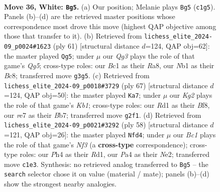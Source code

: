 \documentclass[11pt]{article}
\begin{document}
\clearpage

\begin{figure}[p]\centering
\begin{subfigure}{0.46\textwidth}\centering
\resizebox{\linewidth}{!}{%
\newchessgame
\chessboard[
  setfen={r1b2k2/3pr1bp/1q2p3/p4p1B/P1np3P/5NQ1/1P3PK1/RNBR4 w - - 2 36},
  showmover=false,
  pgfstyle=straightmove, color=movearrow, markmove={c1-g5}
]}
\caption{}
\end{subfigure}\hfill
\begin{subfigure}{0.46\textwidth}\centering
\resizebox{\linewidth}{!}{%
\newchessgame
\chessboard[
  setfen={r1b1r1k1/p4pp1/2P4p/3p3P/Q2Nn1q1/4P1P1/1PR2P2/4KB1R b K - 0 31},
  showmover=false,
  pgfstyle=straightmove, color=movearrow, markmove={g4-g5}
]}
\caption{}
\end{subfigure}
\\[4pt]
\begin{subfigure}{0.46\textwidth}\centering
\resizebox{\linewidth}{!}{%
\newchessgame
\chessboard[
  setfen={1k3b2/1b6/pnr1p1Q1/qn1pP1P1/1p1P4/1P6/P1P1N2P/1KB2B1R b - - 0 34},
  showmover=false,
  pgfstyle=straightmove, color=movearrow, markmove={b8-a7}
]}
\caption{}
\end{subfigure}\hfill
\begin{subfigure}{0.46\textwidth}\centering
\resizebox{\linewidth}{!}{%
\newchessgame
\chessboard[
  setfen={2r3k1/1b5p/1p3qp1/1Bbp1p2/Pp2n3/1P1Q1N2/4NPPP/3R2K1 w - - 8 30},
  showmover=false,
  pgfstyle=straightmove, color=movearrow, markmove={f3-d4}
]}
\caption{}
\end{subfigure}
\caption{\textbf{Move 36, White: \texttt{Bg5}.} (a) Our position; Melanie plays \texttt{Bg5} (\texttt{c1g5}). Panels (b)--(d) are the retrieved master positions whose correspondence most drove this move (highest QAP objective among those that transfer to it). (b) Retrieved from \texttt{lichess\_elite\_2024-09\_p0024\#1623} (ply 61) [structural distance $d$=124, QAP obj=62]: the master played \texttt{Qg5}; under $\mu$ our \emph{Qg3} plays the role of that game's \emph{Qg5}; cross-type roles: our \emph{B}c1 as their \emph{R}a8, our \emph{N}b1 as their \emph{B}c8; transferred move \texttt{g3g5}. (c) Retrieved from \texttt{lichess\_elite\_2024-09\_p0018\#3729} (ply 67) [structural distance $d$=124, QAP obj=50]: the master played \texttt{Ka7}; under $\mu$ our \emph{Kg2} plays the role of that game's \emph{Kb1}; cross-type roles: our \emph{R}d1 as their \emph{B}f8, our \emph{r}e7 as their \emph{B}b7; transferred move \texttt{g2f1}. (d) Retrieved from \texttt{lichess\_elite\_2024-09\_p0021\#3292} (ply 58) [structural distance $d$=121, QAP obj=26]: the master played \texttt{Nfd4}; under $\mu$ our \emph{Bc1} plays the role of that game's \emph{Nf3} (a \textbf{cross-type} correspondence); cross-type roles: our \emph{P}h4 as their \emph{R}d1, our \emph{P}a4 as their \emph{N}e2; transferred move \texttt{c1e3}. Synthesis: no retrieved analog transferred to \texttt{Bg5} -- the \texttt{search} selector chose it on value (material / mate); panels (b)--(d) show the strongest nearby analogies.}
\label{fig:thought-m70}
\end{figure}
\end{document}
